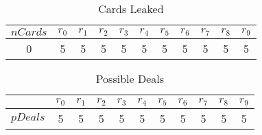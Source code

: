 \documentclass{article}
\begin{document}




\begin{table}[ht] 
\begin{tabular}{ | c || c | c | c | c | c | c | c | c | c | c  | } 
 \hline 
$nCards$  & $r_{0}$ & $r_{1}$ & $r_{2}$ & $r_{3}$ & $r_{4}$ & $r_{5}$ & $r_{6}$ & $r_{7}$ & $r_{8}$ & $r_{9}$ \\ 
 \hline 
0 & 5 & 5 & 5 & 5 & 5 & 5 & 5 & 5 & 5 & 5 \\ 
\hline
\end{tabular}
\caption{Cards Leaked}
\label{cLeaked-0}
\end{table}

\begin{table}[ht] 
\begin{tabular}{ | c || c | c | c | c | c | c | c | c | c | c  | } 
\hline$\;$   & $r_{0}$ & $r_{1}$ & $r_{2}$ & $r_{3}$ & $r_{4}$ & $r_{5}$ & $r_{6}$ & $r_{7}$ & $r_{8}$ & $r_{9}$ \\ 
\hline 
$pDeals$ & 5  & 5  & 5  & 5  & 5  & 5  & 5  & 5  & 5  & 5  \\ 
\hline 
\end{tabular}
\caption{Possible Deals}
\label{pDeals-0}
\end{table}
\end{document}
